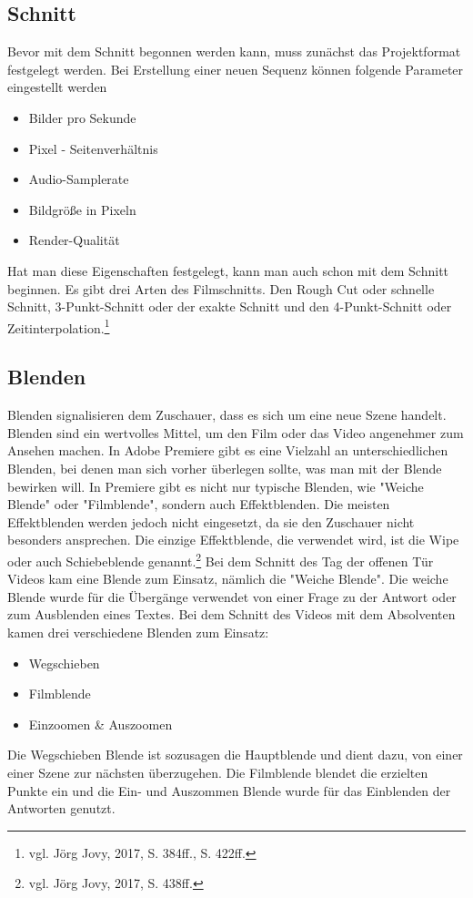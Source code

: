 \subsection{Schnitt}
Bevor mit dem Schnitt begonnen werden kann, muss zunächst das Projektformat festgelegt werden. Bei Erstellung einer neuen Sequenz können folgende Parameter eingestellt werden
\begin{itemize}
	\item Bilder pro Sekunde
	\item Pixel - Seitenverhältnis
	\item Audio-Samplerate
	\item Bildgröße in Pixeln
	\item Render-Qualität
\end{itemize}
Hat man diese Eigenschaften festgelegt, kann man auch schon mit dem Schnitt beginnen. Es gibt drei Arten des Filmschnitts. Den Rough Cut oder schnelle Schnitt, 3-Punkt-Schnitt oder der exakte Schnitt und den 4-Punkt-Schnitt oder Zeitinterpolation.\footnote{vgl. Jörg Jovy, 2017, S. 384ff., S. 422ff.}
\subsection{Blenden}
Blenden signalisieren dem Zuschauer, dass es sich um eine neue Szene handelt. Blenden sind ein wertvolles Mittel, um den Film oder das Video angenehmer zum Ansehen machen. In Adobe Premiere gibt es eine Vielzahl an unterschiedlichen Blenden, bei denen man sich vorher überlegen sollte, was man mit der Blende bewirken will. In Premiere gibt es nicht nur typische Blenden, wie "Weiche Blende" oder "Filmblende", sondern auch Effektblenden. Die meisten Effektblenden werden jedoch nicht eingesetzt, da sie den Zuschauer nicht besonders ansprechen. Die einzige Effektblende, die verwendet wird, ist die Wipe oder auch Schiebeblende genannt.\footnote{vgl. Jörg Jovy, 2017, S. 438ff.}\newline
Bei dem Schnitt des Tag der offenen Tür Videos kam eine Blende zum Einsatz, nämlich die "Weiche Blende". Die weiche Blende wurde für die Übergänge verwendet von einer Frage zu der Antwort oder zum Ausblenden eines Textes.\newline
Bei dem Schnitt des Videos mit dem Absolventen kamen drei verschiedene Blenden zum Einsatz:
\begin{itemize}
	\item Wegschieben
	\item Filmblende
	\item Einzoomen \& Auszoomen
\end{itemize}
Die Wegschieben Blende ist sozusagen die Hauptblende und dient dazu, von einer einer Szene zur nächsten überzugehen. Die Filmblende blendet die erzielten Punkte ein und die Ein- und Auszommen Blende wurde für das Einblenden der Antworten genutzt.
